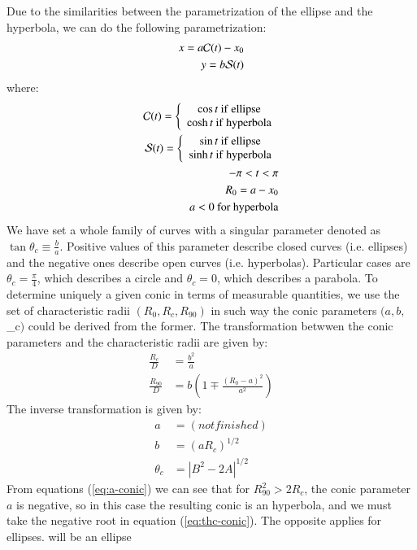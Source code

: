 Due to the similarities between the parametrization of the ellipse and the hyperbola, we can do the following parametrization:
\begin{align}
x = a\mathcal{C}(t)-x_0 \label{eq:par-x}\\ 
y = b\mathcal{S}(t) \label{eq:par-y}
\end{align}
where:
\begin{align}
\mathcal{C}(t) = \left\lbrace \begin{array}{c}
\cos t ~\mathrm{if~ellipse} \\
\cosh t ~\mathrm{if~hyperbola}
\end{array}\right.\\
\mathcal{S}(t) = \left\lbrace \begin{array}{c}
\sin t ~\mathrm{if~ellipse} \\
\sinh t ~\mathrm{if~hyperbola}
\end{array}\right. \\
-\pi < t < \pi \\
R_0 = a - x_0 \\
a<0 ~ \mathrm{for~hyperbola}
\end{align}
We have set a whole family of curves with a singular parameter denoted as $\tan\theta_c \equiv \frac{b}{a}$. Positive values of this parameter describe closed curves
(i.e. ellipses) and the negative ones describe open curves (i.e. hyperbolas). Particular cases are $\theta_c =\frac{\pi}{4}$, which describes a circle and $\theta_c=0$, which describes
a parabola.
To determine uniquely a given conic in terms of measurable quantities, we use the set of characteristic radii $(R_0,R_c,R_{90})$ in such way the conic parameters $(a,b,$\theta_c$)$
could be derived from the former. The transformation betwwen the conic parameters and the characteristic radii are given by:
\begin{align}
\frac{R_c}{D} &= \frac{b^2}{a} \label{eq:Rc-conic}\\ 
\frac{R_{90}}{D} &= b\left(1 \mp \frac{(R_0-a)^2}{a^2}\right)
\end{align}
The inverse transformation is given by:
\begin{align}
a &= (not finished) \label{eq:a-conic}\\
b &= \left(aR_c\right)^{1/2}\\
\theta_c &= \left|B^2 - 2A\right|^{1/2} \label{eq:thc-conic} 
\end{align}
From equations (\ref{eq:a-conic}) we can see that for $R^2_{90} > 2 R_c$, the conic parameter $a$ is negative, so in this case the resulting conic is an hyperbola, and we must take the negative root
in equation (\ref{eq:thc-conic}). The opposite applies for ellipses.
will be an ellipse
